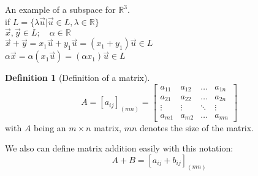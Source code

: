 \documentclass[twoside]{amsart}
\theoremstyle{plain}
\theoremstyle{definition}
\newtheorem{definition}{Definition}
\begin{document}
An example of a subspace for $\mathbb{R}^3$.  \\
\phantom{ An exam} if $L = \{ \lambda \vec{u} | \vec{u} \in L, \lambda \in \mathbb{R} \}$ \\
\phantom{ An exam i} $\vec{x}, \vec{y} \in L; \quad \alpha \in \mathbb{R} $ \\
\phantom{ An exam if $L =$} $\vec{x} + \vec{y} = x_1 \vec{u} + y_1 \vec{u} = (x_1 + y_1) \vec{u} \in L $ \\
\phantom{ An exam i} $\alpha \vec{x} = \alpha (x_1 \vec{u} ) = (\alpha x_1) \vec{u} \in L $ \\

\begin{definition}[Definition of a matrix]\label{D:matrix}
\begin{equation}
A = [a_{ij}]_{(mn)} = \left[ 
\begin{matrix}
a_{11} & a_{12} & \dots & a_{1n} \\ 
a_{21} & a_{22} & \dots & a_{2n} \\
\vdots & \vdots & \ddots & \vdots \\
a_{m1} & a_{m2} & \dots & a_{mn} 
\end{matrix}
  \right]
\end{equation}
with $A$ being an $m \times n$ matrix, $mn$ denotes the size of the matrix.  

We also can define matrix addition easily with this notation:
\begin{equation}
A+B = [a_{ij} + b_{ij}]_{(mn)}
\end{equation}

\end{definition}

\marginpar{ %
\footnotesize{ Possibly useful notation: \\
$ (AB)_{ij} = \sum_{k=1}^n a_{ik}b_{kj} $}} 
\end{document}
